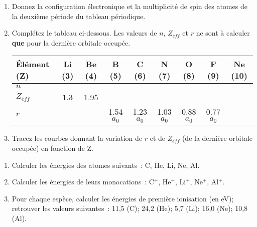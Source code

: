 \begin{enumerate}[\bf 1)]
\item Donnez la configuration \'electronique et la multiplicité de spin des atomes de la deuxi\`eme p\'eriode du tableau p\'eriodique.
\item Compl\'etez le tableau ci-dessous. Les valeurs de $n$, $Z_{eff}$ et $r$ ne sont \`a calculer \textbf{que} pour 
la derni\`ere orbitale occup\'ee.


\vrule

\begin{tabular}{p{3cm}|c|c|c|c|c|c|c|c}
\hline
\textbf{\'El\'ement (Z)}                               & Li (3) & Be (4) & B (5) & C (6) & N (7) & O (8) & F (9) & Ne (10) \\
\hline
$n$        &&&&&&&&\\\hline
$Z_{eff}$  & 1.3    & 1.95   &&&&&&\\\hline
$r$        &        &        & 1.54 $a_0$ & 1.23 $a_0$ & 1.03 $a_0$ & 0.88 $a_0$& 0.77 $a_0$&\\
\hline
\end{tabular}

\vrule

\item Tracez les courbes donnant la variation de $r$ et de $Z_{eff}$ 
(de la derni\`ere orbitale occup\'ee) en fonction de Z. 
\end{enumerate}
\begin{enumerate}[\bf 1)]
\item Calculer les \'energies des atomes suivants~: C, He, Li, Ne, Al.
\item Calculer les \'energies de leurs monocations~: C$^+$, He$^+$, Li$^+$, Ne$^+$, Al$^+$.
\item Pour chaque esp\`ece, calculer les énergies de première ionisation (en eV); retrouver les valeurs suivantes~:
11,5 (C); 24,2 (He); 5,7 (Li); 16,0 (Ne); 10,8 (Al).
\end{enumerate}
